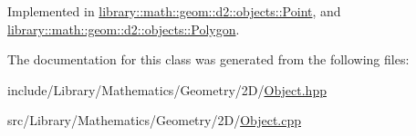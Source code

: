 Implemented in \hyperlink{classlibrary_1_1math_1_1geom_1_1d2_1_1objects_1_1_point_a8e17705a1762fdfdcbed68881afca245}{library\+::math\+::geom\+::d2\+::objects\+::\+Point}, and \hyperlink{classlibrary_1_1math_1_1geom_1_1d2_1_1objects_1_1_polygon_ae5494a1f838d3c325899b6c46237bca8}{library\+::math\+::geom\+::d2\+::objects\+::\+Polygon}.



The documentation for this class was generated from the following files\+:\begin{DoxyCompactItemize}
\item 
include/\+Library/\+Mathematics/\+Geometry/2\+D/\hyperlink{2_d_2_object_8hpp}{Object.\+hpp}\item 
src/\+Library/\+Mathematics/\+Geometry/2\+D/\hyperlink{2_d_2_object_8cpp}{Object.\+cpp}\end{DoxyCompactItemize}
